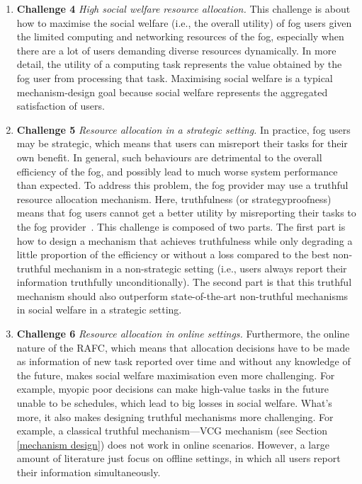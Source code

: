 \documentclass[11pt]{phdthesis}
\begin{document}
\begin{enumerate}
	\item \label{itm: Challenge social welfare} \textbf{Challenge 4} \textit{High social welfare resource allocation.} This challenge is about how to maximise the social welfare (i.e., the overall utility) of fog users given the limited computing and networking resources of the fog, especially when there are a lot of users demanding diverse resources dynamically. In more detail, the utility of a computing task represents the value obtained by the fog user from processing that task. Maximising social welfare is a typical mechanism-design goal because social welfare represents the aggregated satisfaction of users.
	
	\item \label{itm: Challenge truthful} \textbf{Challenge 5} \textit{Resource allocation in a strategic setting.} In practice, fog users may be strategic, which means that users can misreport their tasks for their own benefit. In general, such behaviours are detrimental to the overall efficiency of the fog, and possibly lead to much worse system performance than expected. To address this problem, the fog provider may use a truthful resource allocation mechanism. Here, truthfulness (or strategyproofness) means that fog users cannot get a better utility by misreporting their tasks to the fog provider~\citep{nisan2007algorithmic}. This challenge is composed of two parts. The first part is how to design a mechanism that achieves truthfulness while only degrading a little proportion of the efficiency or without a loss compared to the best non-truthful mechanism in a non-strategic setting (i.e., users always report their information truthfully unconditionally). The second part is that this truthful mechanism should also outperform state-of-the-art non-truthful mechanisms in social welfare in a strategic setting.
	
	\item \label{itm: Challenge online} \textbf{Challenge 6} \textit{Resource allocation in online settings.}
	Furthermore, the online nature of the RAFC, which means that allocation decisions have to be made as information of new task reported over time and without any knowledge of the future, makes social welfare maximisation even more challenging. For example, myopic poor decisions can make high-value tasks in the future unable to be schedules, which lead to big losses in social welfare. What's more, it also makes designing truthful mechanisms more challenging. For example, a classical truthful mechanism---VCG mechanism (see Section \ref{mechanism design}) does not work in online scenarios. However, a large amount of literature just focus on offline settings, in which all users report their information simultaneously. 
	

\end{enumerate}
\end{document}
